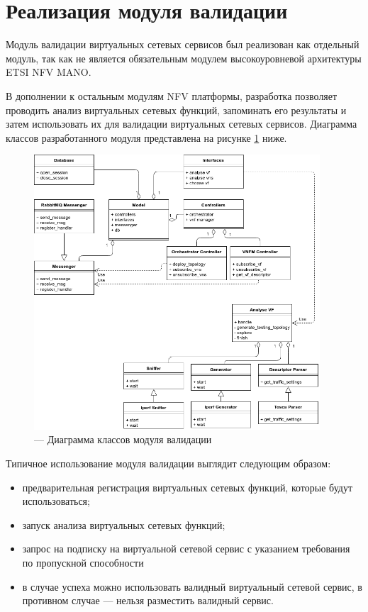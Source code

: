 \documentclass[oneside,final,14pt,a4paper]{extreport}
\begin{document}
\section{Реализация модуля валидации}
\label{sec:developed_module}
Модуль валидации виртуальных сетевых сервисов был реализован как отдельный модуль, так как не является обязательным модулем высокоуровневой архитектуры ETSI NFV MANO. 

В дополнении к остальным модулям NFV платформы, разработка позволяет проводить анализ виртуальных сетевых функций, запоминать его результаты и затем использовать их для валидации виртуальных сетевых сервисов. Диаграмма классов разработанного модуля представлена на рисунке \ref{pic:validation_classes_diagram} ниже.

\begin{figure}[h]
	\centering
	\includegraphics[width=0.95\textwidth]{classes_diagram}
	\caption{--- Диаграмма классов модуля валидации}
	\label{pic:validation_classes_diagram}
\end{figure}

Типичное использование модуля валидации выглядит следующим образом:
\begin{itemize}
    \item предварительная регистрация виртуальных сетевых функций, которые будут использоваться;
    \item запуск анализа виртуальных сетевых функций;
    \item запрос на подписку на виртуальной сетевой сервис с указанием требования по пропускной способности
    \item в случае успеха можно использовать валидный виртуальный сетевой сервис, в противном случае --- нельзя разместить валидный сервис.
\end{itemize}
\end{document}
